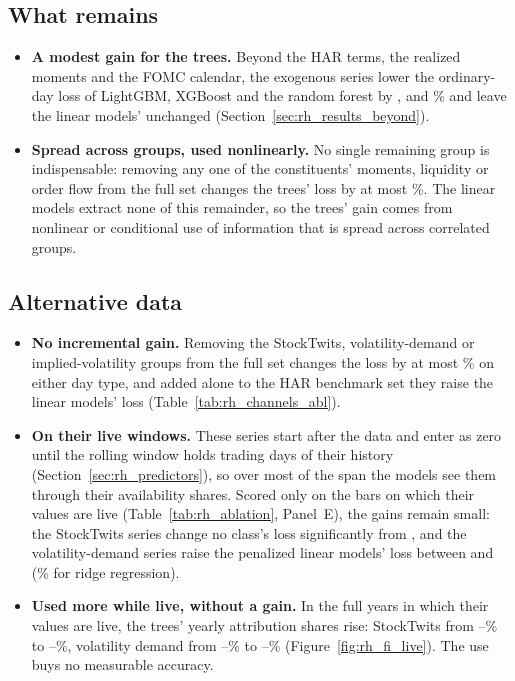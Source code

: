 \subsection{What remains}
\label{sec:rh_fi_rest}
\begin{itemize}
\item \textbf{A modest gain for the trees.} Beyond the HAR terms, the realized moments and the FOMC calendar, the
  exogenous series lower the ordinary-day loss of LightGBM, XGBoost and the random forest by
  \rhabLgbmFullVsAddRmFomcOrdPct, \rhabXgbFullVsAddRmFomcOrdPct{} and \rhabRfFullVsAddRmFomcOrdPct\% and leave the
  linear models' unchanged (Section~\ref{sec:rh_results_beyond}).
\item \textbf{Spread across groups, used nonlinearly.} No single remaining group is indispensable: removing any one of
  the constituents' moments, liquidity or order flow from the full set changes the trees' loss by at most
  \%. The linear models extract none of this remainder, so the trees' gain comes
  from nonlinear or conditional use of information that is spread across correlated groups.
\end{itemize}

\subsection{Alternative data}
\label{sec:rh_fi_alt}
\begin{itemize}
\item \textbf{No incremental gain.} Removing the StockTwits, volatility-demand or implied-volatility groups from the
  full set changes the loss by at most \% on either day type, and added alone to the HAR
  benchmark set they raise the linear models' loss (Table~\ref{tab:rh_channels_abl}).
\item \textbf{On their live windows.} These series start after the data and enter as zero until the rolling window
  holds \rhorWindowDays{} trading days of their history (Section~\ref{sec:rh_predictors}), so over most of the span
  the models see them through their availability shares. Scored only on the bars on which their values are live
  (Table~\ref{tab:rh_ablation}, Panel~E), the gains remain small: the StockTwits series change no class's loss
  significantly from \rhabLiveSentStart, and the volatility-demand series raise the penalized linear models' loss
  between \rhabLiveVdStart{} and \rhabLiveVdEnd{} (\rhabRidgeAddVdLiveVdPct\% for ridge regression).
\item \textbf{Used more while live, without a gain.} In the full years in which their values are live, the trees'
  yearly attribution shares rise: StockTwits from \rhfilStwPreMin--\rhfilStwPreMax\% to
  \rhfilStwLiveMin--\rhfilStwLiveMax\%, volatility demand from \rhfilVdPreMin--\rhfilVdPreMax\% to
  \rhfilVdLiveMin--\rhfilVdLiveMax\% (Figure~\ref{fig:rh_fi_live}). The use buys no measurable accuracy.
\end{itemize}

